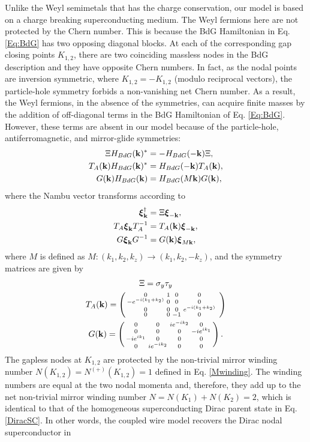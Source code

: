 Unlike the Weyl semimetals that has the charge conservation, our model is based on a charge breaking superconducting medium. The Weyl fermions here are not protected by the Chern number. This is because the BdG Hamiltonian in Eq. \eqref{Eq:BdG} has two opposing diagonal blocks. At each of the corresponding gap closing points $K_{1,2}$, there are two coinciding massless nodes in the BdG description and they have opposite Chern numbers. In fact, as the nodal points are inversion symmetric, where $K_{1,2}=-K_{1,2}$ (modulo reciprocal vectors), the particle-hole symmetry forbids a non-vanishing net Chern number. As a result, the Weyl fermions, in the absence of the symmetries, can acquire finite masses by the addition of off-diagonal terms in the BdG Hamiltonian of Eq. \eqref{Eq:BdG}. However, these terms are absent in our model because of the particle-hole, antiferromagnetic, and mirror-glide symmetries: \begin{align}\Xi H_{BdG}({\bf k})^\ast&=-H_{BdG}(-{\bf k})\Xi,\nonumber\\T_A({\bf k})H_{BdG}({\bf k})^\ast&=H_{BdG}(-{\bf k})T_A({\bf k}),\\G({\bf k})H_{BdG}({\bf k})&=H_{BdG}(M{\bf k})G({\bf k}),\nonumber\end{align} where the Nambu vector transforms according to \begin{align}\boldsymbol\xi_{\bf k}^\dagger&=\Xi\boldsymbol\xi_{-{\bf k}},\nonumber\\T_A\boldsymbol\xi_{\bf k}T_A^{-1}&=T_A({\bf k})\boldsymbol\xi_{-{\bf k}},\\G\boldsymbol\xi_{\bf k}G^{-1}&=G({\bf k})\boldsymbol\xi_{M{\bf k}},\nonumber\end{align} where $M$ is defined as $M:(k_1,k_2,k_z)\to(k_1,k_2,-k_z)$, and the symmetry matrices are given by \begin{gather}\Xi=\sigma_y\tau_y\nonumber\\T_A({\bf k})=\left(\begin{smallmatrix}0&1&0&0\\-e^{-i(k_1+k_2)}&0&0&0&\\0&0&0&e^{-i(k_1+k_2)}\\0&0&-1&0\end{smallmatrix}\right)\\G({\bf k})=\left(\begin{smallmatrix}0&0&ie^{-ik_2}&0\\0&0&0&-ie^{ik_1}\\-ie^{ik_1}&0&0&0\\0&ie^{-ik_2}&0&0\end{smallmatrix}\right).\nonumber\end{gather} The gapless nodes at $K_{1,2}$ are protected by the non-trivial mirror winding number $N(K_{1,2})=N^{(+)}(K_{1,2})=1$ defined in Eq. \eqref{Mwinding}. The winding numbers are equal at the two nodal momenta and, therefore, they add up to the net non-trivial mirror winding number $N=N(K_1)+N(K_2)=2$, which is identical to that of the homogeneous superconducting Dirac parent state in Eq. \eqref{DiracSC}. In other words, the coupled wire model recovers the Dirac nodal superconductor in 